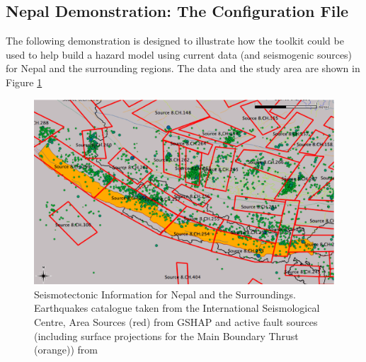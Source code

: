 
\subsection{Nepal Demonstration: The Configuration File}

The following demonstration is designed to illustrate how the toolkit could be used to help build a hazard model using current data (and seismogenic sources) for Nepal and the surrounding regions. The data and the study area are shown in Figure \ref{fig:KathGSHAPLabel}

\begin{figure}[htbp]
	\centering
		\includegraphics[width=15cm, keepaspectratio=true]{./figures/Kathmandu_plus_GSHAP_sources_labelled.eps}
	\caption{Seismotectonic Information for Nepal and the Surroundings. Earthquakes catalogue taken from the International Seismological Centre, Area Sources (red) from GSHAP and active fault sources (including surface projections for the Main Boundary Thrust (orange)) from \cite{TaylorYin2009}}
	\label{fig:KathGSHAPLabel}
\end{figure}







